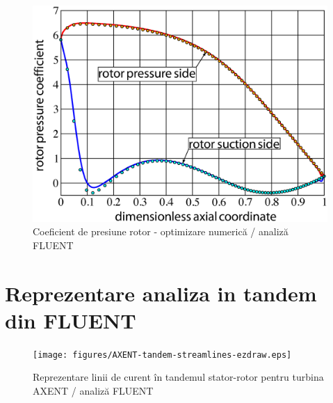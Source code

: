 \begin{figure}[h]
	\centering
	\includegraphics[scale=0.5]{figures/cp-rotor-ezdraw.eps}
	\caption{Coeficient de presiune rotor - optimizare numerică / analiză FLUENT}
	\label{Coeficient de presiune rotor - optimizare numerică / analiză FLUENT}
\end{figure}

\clearpage


\section{Reprezentare analiza in tandem din FLUENT}

\begin{figure}[h]
	\centering
	\texttt{[image: figures/AXENT-tandem-streamlines-ezdraw.eps]}
	\caption{Reprezentare linii de curent în tandemul stator-rotor pentru turbina AXENT / analiză FLUENT}
	\label{Reprezentare linii de curent în tandemul stator-rotor pentru turbina AXENT / analiză FLUENT}
\end{figure}

\clearpage